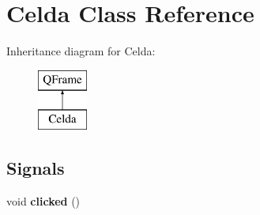 \hypertarget{class_celda}{\section{Celda Class Reference}
\label{class_celda}
}
Inheritance diagram for Celda\-:\begin{figure}[H]
\begin{center}
\leavevmode
\includegraphics[height=2.000000cm]{class_celda}
\end{center}
\end{figure}
\subsection*{Signals}
\begin{DoxyCompactItemize}
\item 
\hypertarget{class_celda_a7f23df77ebd6ac50edb1e46101d2734a}{void {\bfseries clicked} ()}\label{class_celda_a7f23df77ebd6ac50edb1e46101d2734a}

\end{DoxyCompactItemize}
